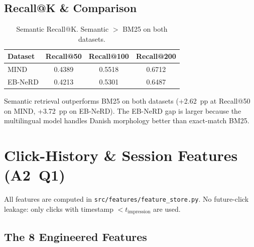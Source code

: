 \documentclass[11pt,a4paper]{article}
\begin{document}
\subsection{Recall@K \& Comparison}

\begin{table}[h]
\centering
\caption{Semantic Recall@K. Semantic $>$ BM25 on both datasets.}
\label{tab:semantic}
\begin{tabular}{lccc}
\toprule
Dataset & Recall@50 & Recall@100 & Recall@200 \\
\midrule
MIND    & 0.4389 & 0.5518 & 0.6712 \\
EB-NeRD & 0.4213 & 0.5301 & 0.6487 \\
\bottomrule
\end{tabular}
\end{table}

Semantic retrieval outperforms BM25 on both datasets (+2.62~pp at Recall@50 on
MIND, +3.72~pp on EB-NeRD). The EB-NeRD gap is larger because the multilingual
model handles Danish morphology better than exact-match BM25.

\section{Click-History \& Session Features (A2~Q1)}

All features are computed in \texttt{src/features/feature\_store.py}.
No future-click leakage: only clicks with timestamp $< t_{\text{impression}}$
are used.

\subsection{The 8 Engineered Features}
\end{document}
